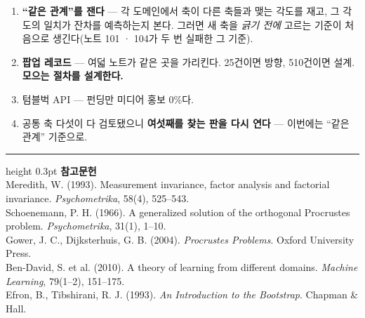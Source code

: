 \documentclass[10pt]{article}
\begin{document}
\begin{enumerate}[leftmargin=1.3em,itemsep=0.15em]
\item \textbf{``같은 관계''를 잰다} --- 각 도메인에서 축이 다른 축들과 맺는
      각도를 재고, 그 각도의 일치가 잔차를 예측하는지 본다. 그러면 새 축을
      \emph{긁기 전에} 고르는 기준이 처음으로 생긴다(노트 101 · 104가 두 번
      실패한 그 기준).
\item \textbf{팝업 레코드} --- 여덟 노트가 같은 곳을 가리킨다. 25건이면 방향,
      510건이면 설계. \textbf{모으는 절차를 설계한다.}
\item 텀블벅 API --- 펀딩만 미디어 홍보 0\%다.
\item 공통 축 다섯이 다 검토됐으니 \textbf{여섯째를 찾는 판을 다시 연다} ---
      이번에는 ``같은 관계'' 기준으로.
\end{enumerate}

\vspace{0.6em}
\hrule height 0.3pt
\vspace{0.5em}
{\footnotesize
\textbf{참고문헌}\\[0.3em]
Meredith, W. (1993). Measurement invariance, factor analysis and factorial
invariance. \emph{Psychometrika}, 58(4), 525--543.\\[0.15em]
Schoenemann, P. H. (1966). A generalized solution of the orthogonal Procrustes
problem. \emph{Psychometrika}, 31(1), 1--10.\\[0.15em]
Gower, J. C., Dijksterhuis, G. B. (2004). \emph{Procrustes Problems}.
Oxford University Press.\\[0.15em]
Ben-David, S. et al. (2010). A theory of learning from different domains.
\emph{Machine Learning}, 79(1--2), 151--175.\\[0.15em]
Efron, B., Tibshirani, R. J. (1993). \emph{An Introduction to the Bootstrap}.
Chapman \& Hall.
}
\end{document}
